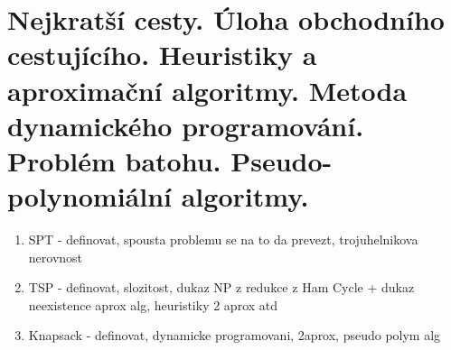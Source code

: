 \section[KO - SPT, TSP, knapsack]{Nejkratší cesty. Úloha obchodního cestujícího. Heuristiky a aproximační algoritmy. Metoda dynamického programování. Problém batohu. Pseudo-polynomiální algoritmy.}

\begin{enumerate}
\item SPT - definovat, spousta problemu se na to da prevezt, trojuhelnikova nerovnost
\item TSP - definovat, slozitost, dukaz NP z redukce z Ham Cycle + dukaz neexistence aprox alg, heuristiky 2 aprox atd
\item Knapsack - definovat, dynamicke programovani, 2aprox, pseudo polym alg
\end{enumerate}